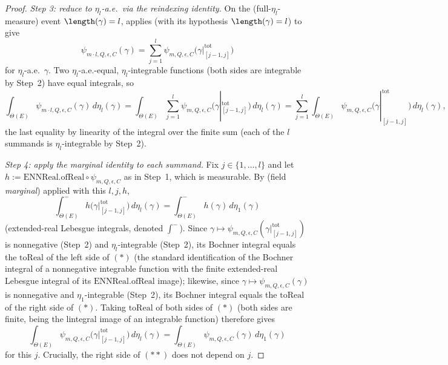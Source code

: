 \begin{proof}
  \emph{Step 3: reduce to $\eta_l$-a.e.\ via the reindexing identity.} On the (full-$\eta_l$-measure)
  event $\length(\gamma)=l$,  applies (with its hypothesis $\length(\gamma)=l$)
  to give
  \[
    \psi_{m\cdot l,Q,\epsilon,C}(\gamma) = \sum_{j=1}^l
      \psi_{m,Q,\epsilon,C}\bigl(\gamma|^{\mathrm{tot}}_{[j-1,j]}\bigr)
  \]
  for $\eta_l$-a.e.\ $\gamma$. Two $\eta_l$-a.e.-equal, $\eta_l$-integrable functions (both sides
  are integrable by Step~2) have equal integrals, so
  \[
    \int_{\Theta(E)} \psi_{m\cdot l,Q,\epsilon,C}(\gamma)\,d\eta_l(\gamma)
    = \int_{\Theta(E)} \sum_{j=1}^l \psi_{m,Q,\epsilon,C}\bigl(\gamma|^{\mathrm{tot}}_{[j-1,j]}\bigr)
      \, d\eta_l(\gamma)
    = \sum_{j=1}^l \int_{\Theta(E)} \psi_{m,Q,\epsilon,C}\bigl(\gamma|^{\mathrm{tot}}_{[j-1,j]}\bigr)
      \, d\eta_l(\gamma)
    ,
  \]
  the last equality by linearity of the integral over the finite sum (each of the $l$ summands is
  $\eta_l$-integrable by Step~2).

  \emph{Step 4: apply the marginal identity to each summand.} Fix $j\in\{1,\dotsc,l\}$ and let
  $h := \mathrm{ENNReal.ofReal}\circ\psi_{m,Q,\epsilon,C}$ as in Step~1, which is measurable. By
   (field \emph{marginal}) applied with this $l,j,h$,
  \[
    \int^-_{\Theta(E)} h\bigl(\gamma|^{\mathrm{tot}}_{[j-1,j]}\bigr) \, d\eta_l(\gamma)
    = \int^-_{\Theta(E)} h(\gamma) \, d\eta_1(\gamma)
    \tag{$\ast$}
  \]
  (extended-real Lebesgue integrals, denoted $\int^-$). Since $\gamma \mapsto
  \psi_{m,Q,\epsilon,C}(\gamma|^{\mathrm{tot}}_{[j-1,j]})$ is nonnegative (Step~2) and
  $\eta_l$-integrable (Step~2), its Bochner integral equals the $\mathrm{toReal}$ of the left side
  of $(\ast)$ (the standard identification of the Bochner integral of a nonnegative integrable
  function with the finite extended-real Lebesgue integral of its $\mathrm{ENNReal.ofReal}$ image);
  likewise, since $\gamma\mapsto\psi_{m,Q,\epsilon,C}(\gamma)$ is nonnegative and $\eta_1$-integrable
  (Step~2), its Bochner integral equals the $\mathrm{toReal}$ of the right side of $(\ast)$. Taking
  $\mathrm{toReal}$ of both sides of $(\ast)$ (both sides are finite, being the lintegral image of
  an integrable function) therefore gives
  \[
    \int_{\Theta(E)} \psi_{m,Q,\epsilon,C}\bigl(\gamma|^{\mathrm{tot}}_{[j-1,j]}\bigr) \, d\eta_l(\gamma)
    = \int_{\Theta(E)} \psi_{m,Q,\epsilon,C}(\gamma) \, d\eta_1(\gamma)
    \tag{$\ast\ast$}
  \]
  for this $j$. Crucially, the right side of $(\ast\ast)$ does not depend on $j$.


\end{proof}
